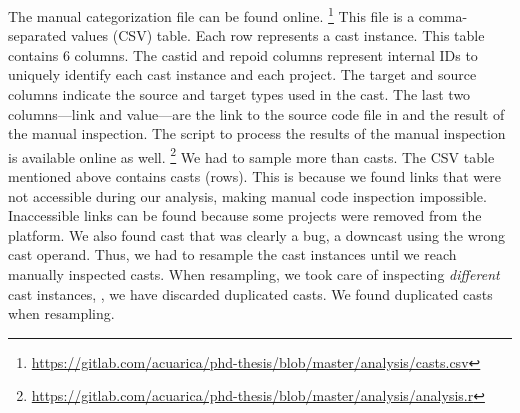 \newcommand\col[1]{\textsf{#1}}
The manual categorization file can be found online.%
\footnote{\url{https://gitlab.com/acuarica/phd-thesis/blob/master/analysis/casts.csv}}
This file is a comma-separated values (CSV) table.
Each row represents a cast instance.
This table contains 6 columns.
The \col{castid} and \col{repoid} columns represent internal IDs to uniquely identify each cast instance and each project.
The \col{target} and \col{source} columns indicate the source and target types used in the cast.
The last two columns---\col{link} and \col{value}---are the link to the source code file in \lgtm{} and the result of the manual inspection.
The script to process the results of the manual inspection is available online as well.%
\footnote{\url{https://gitlab.com/acuarica/phd-thesis/blob/master/analysis/analysis.r}}
We had to sample more than \nSize{} casts.
The CSV table mentioned above contains \nSeen{} casts (rows).
This is because we found \nBrokenLink{} links that were not accessible during our analysis,
making manual code inspection impossible.
Inaccessible links can be found because some projects were removed from the \lgtm{} platform.
We also found \nBug{} cast that was clearly a bug,
a downcast using the wrong cast operand.
Thus, we had to resample the cast instances until we reach \nSize{} manually inspected casts.
When resampling, we took care of inspecting \emph{different} cast instances, \ie{},
we have discarded duplicated casts.
We found \nDuplicated{} duplicated casts when resampling.
